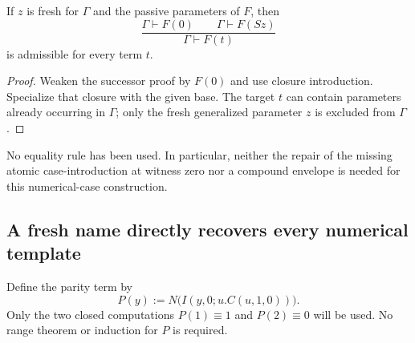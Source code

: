 \begin{corollary}
If $z$ is fresh for $\Gamma$ and the passive parameters of $F$, then
\[
 \frac{\Gamma\vdash F(0)\qquad\Gamma\vdash F(Sz)}
      {\Gamma\vdash F(t)}
\]
is admissible for every term $t$.
\end{corollary}
\begin{proof}
Weaken the successor proof by $F(0)$ and use closure introduction.
Specialize that closure with the given base. The target $t$ can contain
parameters already occurring in $\Gamma$; only the fresh generalized
parameter $z$ is excluded from $\Gamma$.
\end{proof}

No equality rule has been used. In particular, neither the repair of
the missing atomic case-introduction at witness zero nor a compound
envelope is needed for this numerical-case construction.

\subsection{A fresh name directly recovers every numerical template}

Define the parity term by
\[
 P(y):=N\bigl(I(y,0;u.C(u,1,0))\bigr).
\]
Only the two closed computations $P(1)\equiv1$ and $P(2)\equiv0$
will be used. No range theorem or induction for $P$ is required.

